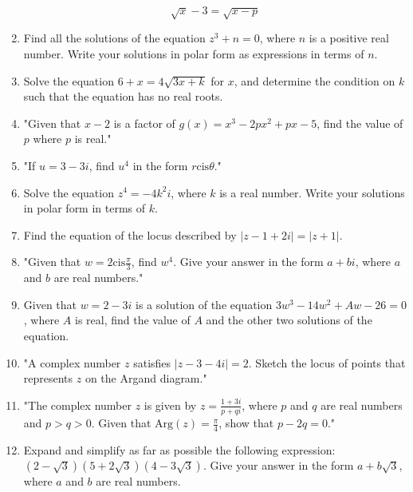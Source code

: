 \documentclass{article}
\begin{document}
\begin{enumerate}
\[
\sqrt{x} - 3 = \sqrt{x - p}
\]
\vspace{3cm}
\item Find all the solutions of the equation \( z^3 + n = 0 \), where \( n \) is a positive real number. Write your solutions in polar form as expressions in terms of \( n \).
\vspace{3cm}
\item Solve the equation \(6 + x = 4\sqrt{3x + k}\) for \(x\), and determine the condition on \(k\) such that the equation has no real roots.
\vspace{3cm}
\item "Given that \( x - 2 \) is a factor of \( g(x) = x^3 - 2px^2 + px - 5 \), find the value of \( p \) where \( p \) is real."
\vspace{3cm}
\item "If \( u = 3 - 3i \), find \( u^4 \) in the form \( r \text{cis} \theta \)."
\vspace{3cm}
\item Solve the equation \( z^4 = -4k^2i \), where \( k \) is a real number. Write your solutions in polar form in terms of \( k \).
\vspace{3cm}
\item Find the equation of the locus described by \( |z - 1 + 2i| = |z + 1| \).
\vspace{3cm}
\item "Given that \( w = 2 \text{cis} \frac{\pi}{3} \), find \( w^4 \). Give your answer in the form \( a + bi \), where \( a \) and \( b \) are real numbers."
\vspace{3cm}
\item Given that \( w = 2 - 3i \) is a solution of the equation \( 3w^3 - 14w^2 + Aw - 26 = 0 \), where \( A \) is real, find the value of \( A \) and the other two solutions of the equation.
\vspace{3cm}
\item "A complex number \( z \) satisfies \( |z - 3 - 4i| = 2 \). Sketch the locus of points that represents \( z \) on the Argand diagram."
\vspace{3cm}
\item "The complex number \( z \) is given by \( z = \frac{1+3i}{p+qi} \), where \( p \) and \( q \) are real numbers and \( p > q > 0 \). Given that \(\text{Arg}(z) = \frac{\pi}{4}\), show that \( p - 2q = 0 \)."
\vspace{3cm}
\item Expand and simplify as far as possible the following expression: \((2 - \sqrt{3})(5 + 2\sqrt{3})(4 - 3\sqrt{3})\). Give your answer in the form \( a + b\sqrt{3} \), where \( a \) and \( b \) are real numbers.

\end{enumerate}
\end{document}

